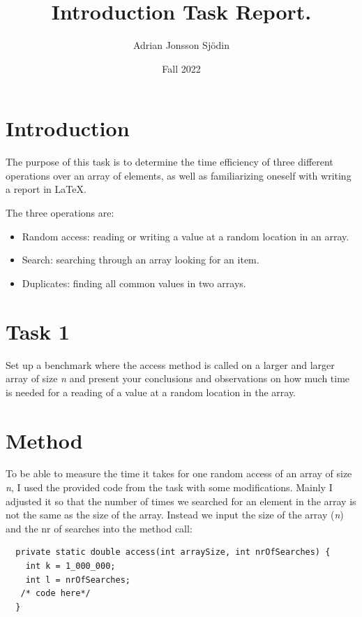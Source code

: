 \documentclass[a4paper,11pt]{article}
\begin{document}
\title{
  \textbf{Introduction Task Report.}
}
\author{Adrian Jonsson Sjödin}
\date{Fall 2022}

\maketitle

\section*{Introduction}

The purpose of this task is to determine the time efficiency of three different operations
over an array of elements, as well as familiarizing oneself with writing a report in \LaTeX.

The three operations are:
\begin{itemize}
  \item Random access: reading or writing a value at a random location in an array.
  \item Search: searching through an array looking for an item.
  \item Duplicates: finding all common values in two arrays.
\end{itemize}

\section*{Task 1}

Set up a benchmark where the access method is called on a larger and larger array of size
\textit{n} and present your conclusions and observations on how much time is needed for a reading
of a value at a random location in the array.

\section*{Method}

To be able to measure the time it takes for one random access of an array of size
\textit{n}, I used the provided code from the task with some modifications. Mainly I adjusted
it so that the number of times we searched for an element in the array is not the same as
the size of the array. Instead we input the size of the array (\textit{n}) and the nr of
searches into the method call:

\begin{verbatim}
  private static double access(int arraySize, int nrOfSearches) {
    int k = 1_000_000;
    int l = nrOfSearches;
   /* code here*/
  }
\end{verbatim}
\end{document}
